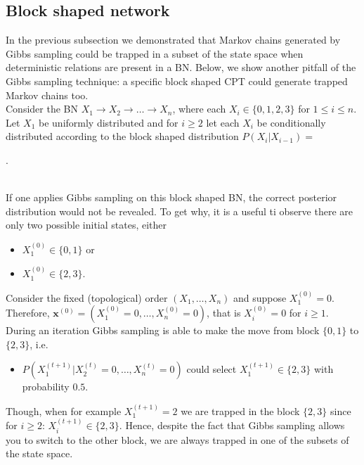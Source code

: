 \documentclass[a4paper, twoside, 11pt]{report}
\newcommand{\bfx}{{\mathbf{x}}}
\theoremstyle{plain}
\theoremstyle{definition}
\theoremstyle{remark}
\begin{document}
\subsection{Block shaped network}
In the previous subsection we demonstrated that Markov chains generated by Gibbs sampling could be trapped in a subset of the state space when deterministic relations are present in a BN. Below, we show another pitfall of the Gibbs sampling technique: a specific block shaped CPT could generate trapped Markov chains too.\\

Consider the BN $X_1 \to X_2 \to \ldots \to X_n$, where each $X_i \in \{0,1,2,3\}$ for $1 \leq i \leq n$. Let $X_1$ be uniformly distributed and for $i \geq 2$ let each $X_i$ be conditionally distributed according to the block shaped distribution $P(X_i |X_{i-1})=$
\begin{table}[h!]
\centering
{}.
\caption{a block shaped CPT}
\label{block}
\end{table}\\
If one applies Gibbs sampling on this block shaped BN, the correct posterior distribution would not be revealed. To get why, it is a useful ti observe there are only two possible initial states, either
\begin{itemize}
\item $X^{(0)}_1 \in \{0, 1\}$ or
\item $X^{(0)}_1 \in \{2, 3\}$.
\end{itemize}
Consider the fixed (topological) order $(X_1, \ldots, X_n)$ and suppose $X^{(0)}_1 = 0$. Therefore, $\bfx^{(0)} = (X^{(0)}_1 = 0, \ldots, X^{(0)}_n = 0)$, that is $X_i^{(0)} = 0$ for $i \geq 1$. During an iteration Gibbs sampling is able to make the move from block $\{0, 1\}$ to $\{2,3\}$, i.e.
\begin{itemize}
\item $P(X^{(t+1)}_1 | X^{(t)}_2 = 0, \ldots, X^{(t)}_n = 0)$ could select $X^{(t+1)}_1 \in \{2,3\}$ with probability $0.5$.
\end{itemize}
Though, when for example $X^{(t+1)}_1 = 2$ we are trapped in the block $\{2,3\}$ since for $i \geq 2$: $X^{(t+1)}_i \in \{2, 3\}$. Hence, despite the fact that Gibbs sampling allows you to switch to the other block, we are always trapped in one of the subsets of the state space. \\
\end{document}
